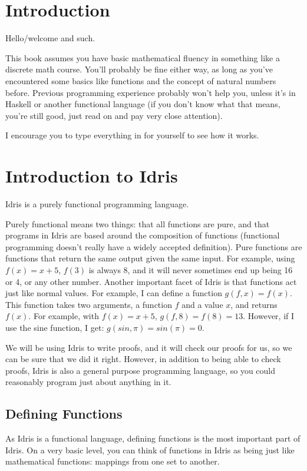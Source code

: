 \documentclass{article}
\begin{document}
\section{Introduction}
Hello/welcome and such.

This book assumes you have basic mathematical fluency in something like a discrete math course.
You'll probably be fine either way, as long as you've encountered some basics like functions and the concept of natural numbers before.
Previous programming experience probably won't help you, unless it's in Haskell or another functional language (if you don't know what that means, you're still good, just read on and pay very close attention).

I encourage you to type everything in for yourself to see how it works.

\section{Introduction to Idris}

Idris is a purely functional programming language.

Purely functional means two things: that all functions are pure, and that programs in Idris are based around the composition of functions (functional programming doesn't really have a widely accepted definition).
Pure functions are functions that return the same output given the same input.
For example, using $f(x) = x + 5$, $f(3)$ is always 8, and it will never sometimes end up being 16 or 4, or any other number.
Another important facet of Idris is that functions act just like normal values.
For example, I can define a function $g(f, x) = f(x)$.
This function takes two arguments, a function $f$ and a value $x$, and returns $f(x)$.
For example, with $f(x) = x + 5$, $g(f, 8) = f(8) = 13$.
However, if I use the sine function, I get: $g(sin, \pi) = sin(\pi) = 0$.

We will be using Idris to write proofs, and it will check our proofs for us, so we can be sure that we did it right.
However, in addition to being able to check proofs, Idris is also a general purpose programming language, so you could reasonably program just about anything in it.

\subsection{Defining Functions}
As Idris is a functional language, defining functions is the most important part of Idris.
On a very basic level, you can think of functions in Idris as being just like mathematical functions: mappings from one set to another.
\end{document}
